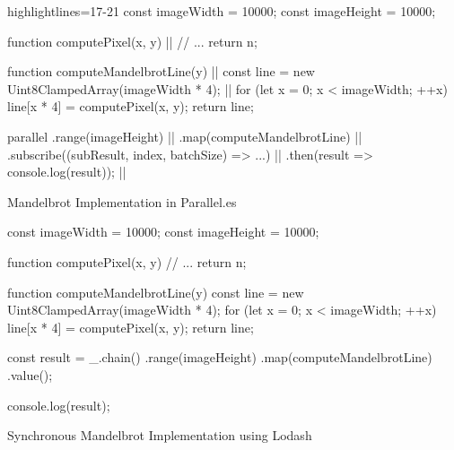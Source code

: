 \begin{listing}
	\begin{javascriptcode*}{highlightlines={17-21}}
const imageWidth = 10000;
const imageHeight = 10000;

function computePixel(x, y) { |$\label{code:mandelbrot-compute-pixel}$|
	// ...
	return n;
}

function computeMandelbrotLine(y) { |$\label{code:parallel-es-operation}$|
	const line = new Uint8ClampedArray(imageWidth * 4); |$\label{code:mandelbrot-reference1-imageWidth}$|
	for (let x = 0; x < imageWidth; ++x) {
		line[x * 4] = computePixel(x, y);
	}
	return line;
}

parallel
	.range(imageHeight) |$\label{code:parallel-es-definition-start}$|
	.map(computeMandelbrotLine)	 |$\label{code:parallel-es-map}$|
	.subscribe((subResult, index, batchSize) => ...) |$\label{code:parallel-es-subscribe}$|
	.then(result => console.log(result)); |$\label{code:parallel-es-start}$|
	\end{javascriptcode*}
	
	\caption{Mandelbrot Implementation in Parallel.es}
	\label{code:mandelbrot-parallel.es}
\end{listing}


\begin{listing}
	
	\begin{javascriptcode}
const imageWidth = 10000;
const imageHeight = 10000;

function computePixel(x, y) {
	// ...
	return n;
}

function computeMandelbrotLine(y) {
	const line = new Uint8ClampedArray(imageWidth * 4);
	for (let x = 0; x < imageWidth; ++x) {
		line[x * 4] = computePixel(x, y);
	}
	return line;
}

const result = _.chain()
	.range(imageHeight)
	.map(computeMandelbrotLine)
	.value();
	
console.log(result);
\end{javascriptcode}
\caption{Synchronous Mandelbrot Implementation using Lodash~\cite{lodash}}
\label{fig:mandelbrot-sync}
\end{listing}